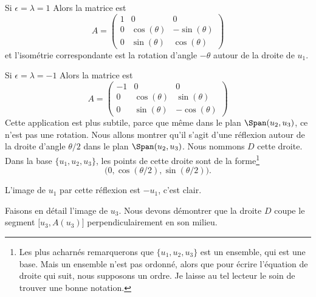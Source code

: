 \begin{subproof}
    \item[Si \( \epsilon=\lambda=1\)] Alors la matrice est
    \begin{equation}
        A=\begin{pmatrix}
            1    &   0    &   0    \\
            0    &   \cos(\theta)    &   -\sin(\theta)    \\
            0    &   \sin(\theta)    &   \cos(\theta)
        \end{pmatrix}
    \end{equation}
    et l'isométrie correspondante est la rotation d'angle \( -\theta\) autour de la droite de \( u_1\).

    \item[Si \( \epsilon=\lambda=-1\)]
    Alors la matrice est
    \begin{equation}
        A=\begin{pmatrix}
            -1    &  0     &   0    \\
            0    &   \cos(\theta)    &   \sin(\theta)    \\
            0    &   \sin(\theta)    &   -\cos(\theta)
        \end{pmatrix}
    \end{equation}
    Cette application est plus subtile, parce que même dans le plan \( \Span(u_2,u_3)\), ce n'est pas une rotation. Nous allons montrer qu'il s'agit d'une réflexion autour de la droite d'angle \( \theta/2\) dans le plan \( \Span(u_2,u_3)\). Nous nommons \( D\) cette droite. Dans la base \( \{ u_1,u_2,u_3 \}\), les points de cette droite sont de la forme\footnote{Les plus acharnés remarquerons que \( \{ u_1,u_2,u_3 \}\) est un ensemble, qui est une base. Mais un ensemble n'est pas ordonné, alors que pour écrire l'équation de droite qui suit, nous supposons un ordre. Je laisse au tel lecteur le soin de trouver une bonne notation.}
    \begin{equation}
        \big( 0,\cos(\theta/2),\sin(\theta/2) \big).
    \end{equation}

    L'image de \( u_1\) par cette réflexion est \(-u_1\), c'est clair.

    Faisons en détail l'image de \( u_3\). Nous devons démontrer que la droite \( D\) coupe le segment \( \mathopen[ u_3 , A(u_3) \mathclose]\) perpendiculairement en son milieu.


\end{subproof}
